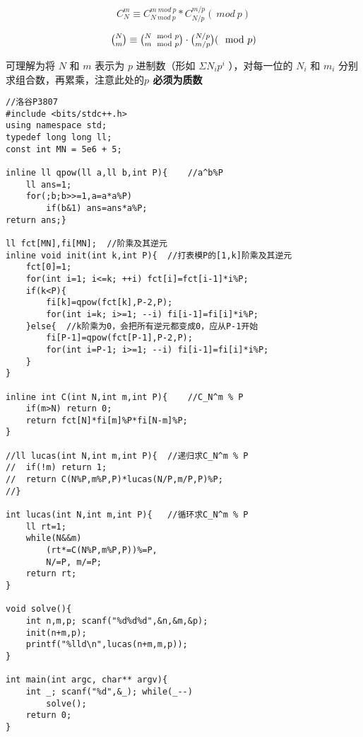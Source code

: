 
$$C_N^m \equiv C_{N\ mod\ p}^{m\ mod\ p} * C_{N/p}^{m/p}(\ mod\ p)$$

$$\tbinom N m \equiv \tbinom{N\mod p}{m\mod p} \cdot \tbinom{N/p}{m/p}(\mod p)$$

可理解为将 $N$ 和 $m$ 表示为 $p$ 进制数（形如 $\Sigma N_ip^i$ ），对每一位的 $N_i$ 和 $m_i$ 分别求组合数，再累乘，注意此处的\textbf{$p$ 必须为质数}

\begin{lstlisting}
//洛谷P3807 
#include <bits/stdc++.h>
using namespace std;
typedef long long ll;
const int MN = 5e6 + 5;

inline ll qpow(ll a,ll b,int P){	//a^b%P 
	ll ans=1;
	for(;b;b>>=1,a=a*a%P)
		if(b&1) ans=ans*a%P;
return ans;}

ll fct[MN],fi[MN];	//阶乘及其逆元
inline void init(int k,int P){	//打表模P的[1,k]阶乘及其逆元
	fct[0]=1;
	for(int i=1; i<=k; ++i) fct[i]=fct[i-1]*i%P;
	if(k<P){
		fi[k]=qpow(fct[k],P-2,P);
		for(int i=k; i>=1; --i) fi[i-1]=fi[i]*i%P;
	}else{	//k阶乘为0，会把所有逆元都变成0，应从P-1开始
		fi[P-1]=qpow(fct[P-1],P-2,P);
		for(int i=P-1; i>=1; --i) fi[i-1]=fi[i]*i%P;
	}
}

inline int C(int N,int m,int P){	//C_N^m % P
	if(m>N) return 0;
	return fct[N]*fi[m]%P*fi[N-m]%P;
}

//ll lucas(int N,int m,int P){	//递归求C_N^m % P
//	if(!m) return 1;
//	return C(N%P,m%P,P)*lucas(N/P,m/P,P)%P;
//}

int lucas(int N,int m,int P){	//循环求C_N^m % P
	ll rt=1;
	while(N&&m)
		(rt*=C(N%P,m%P,P))%=P,
		N/=P, m/=P;
	return rt;
}

void solve(){
	int n,m,p; scanf("%d%d%d",&n,&m,&p);
	init(n+m,p);
	printf("%lld\n",lucas(n+m,m,p));
}

int main(int argc, char** argv){ 
	int _; scanf("%d",&_); while(_--)
		solve();
	return 0;
}
\end{lstlisting}